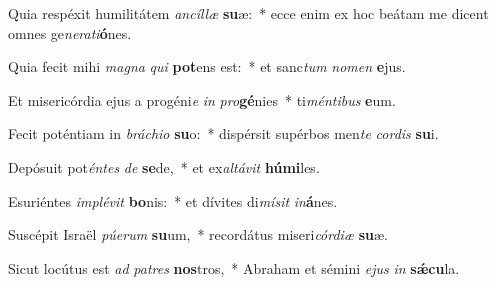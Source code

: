 \item Quia respéxit humilitátem \textit{an}\textit{cíl}\textit{læ} \textbf{su}æ:~* ecce enim ex hoc beátam me dicent omnes ge\textit{ne}\textit{ra}\textit{ti}\textbf{ó}nes.
\item Quia fecit mihi \textit{ma}\textit{gna} \textit{qui} \textbf{pot}ens est:~* et sanc\textit{tum} \textit{no}\textit{men} \textbf{e}jus.
\item Et misericórdia ejus a progéni\textit{e} \textit{in} \textit{pro}\textbf{gé}nies~* ti\textit{mén}\textit{ti}\textit{bus} \textbf{e}um.
\item Fecit poténtiam in \textit{brá}\textit{chi}\textit{o} \textbf{su}o:~* dispérsit supérbos men\textit{te} \textit{cor}\textit{dis} \textbf{su}i.
\item Depósuit pot\textit{én}\textit{tes} \textit{de} \textbf{se}de,~* et ex\textit{al}\textit{tá}\textit{vit} \textbf{hú}\textbf{mi}les.
\item Esuriéntes \textit{im}\textit{plé}\textit{vit} \textbf{bo}nis:~* et dívites di\textit{mí}\textit{sit} \textit{in}\textbf{á}nes.
\item Suscépit Israël \textit{pú}\textit{e}\textit{rum} \textbf{su}um,~* recordátus miseri\textit{cór}\textit{di}\textit{æ} \textbf{su}æ.
\item Sicut locútus est \textit{ad} \textit{pa}\textit{tres} \textbf{nos}tros,~* Abraham et sémini \textit{e}\textit{jus} \textit{in} \textbf{sǽ}\textbf{cu}la.
